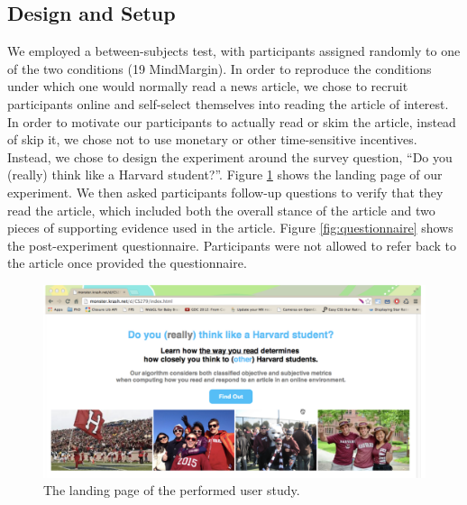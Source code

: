 \subsection{Design and Setup}
We employed a between-subjects test, with participants assigned randomly to one of the two conditions (19 MindMargin). In order to reproduce the conditions under which one would normally read a news article, we chose to recruit participants online and self-select themselves into reading the article of interest. In order to motivate our participants to actually read or skim the article, instead of skip it, we chose not to use monetary or other time-sensitive incentives. Instead, we chose to design the experiment around the survey question, “Do you (really) think like a Harvard student?”. Figure \ref{fig:landingpage} shows the landing page of our experiment. We then asked participants follow-up questions to verify that they read the article, which included both the overall stance of the article and two pieces of supporting evidence used in the article. Figure \ref{fig:questionnaire} shows the post-experiment questionnaire. Participants were not allowed to refer back to the article once provided the questionnaire. 

\begin{figure}
\centering
\includegraphics[scale=0.23]{landingpage.png} 
\caption{The landing page of the performed user study.}
\label{fig:landingpage}
\end{figure}

